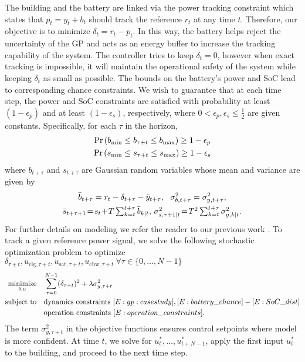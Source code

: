 The building and the battery are linked via the power tracking constraint which states that \(p_t = y_t + b_t\) should track the reference \(r_t\) at any time \(t\). Therefore, our objective is to minimize \(\delta_t = r_t - p_t\).
In this way, the battery helps reject the uncertainty of the GP and acts as an energy buffer to increase the tracking capability of the system. 
The controller tries to keep \(\delta_t = 0\), however when exact tracking is impossible, it will maintain the operational safety of the system while keeping \(\delta_t\)  as small as possible.
The bounds on the battery's power and SoC lead to corresponding chance constraints.
We wish to guarantee that at each time step, the power and SoC constraints are satisfied with probability at least \((1 - \epsilon_p)\) and  at least \((1 - \epsilon_s)\), respectively, where \(0 < \epsilon_p, \epsilon_s \leq \frac{1}{2}\) are given constants.
Specifically, for each \(\tau\) in the horizon,
	\begin{gather}
	\label{E:battery_chance}
	\Pr\left( \Pbmin \leq b_{\tau+t}\leq \Pbmax \right) \geq 1 - \epsilon_p  \\
	\label{E:SoC_chance}
	\Pr\left( \SOCmin \leq s_{\tau+t} \leq \SOCmax \right) \geq 1 - \epsilon_s 
	\end{gather}
where \(b_{t+\tau}\) and \(s_{t+\tau}\) are Gaussian random variables whose mean and variance are given by
\begin{gather}
\bar{b}_{t+\tau}= r_{t} - \delta_{t+\tau} - \bar{y}_{t+\tau}, \ \ 
\sigma^2_{b,t+\tau} =  \sigma^2_{y,t+\tau} \text, \label{E:battery_dist} \\
\bar{s}_{t+\tau+1}\!=\! s_t \!+\! T \textstyle\sum_{k=t}^{t+\tau} \predict{k}{\bar{\Pbatt}}, \,
\predict{s,\tau+1}{\sigma^2} \!=\! T^2 \textstyle\sum_{k=t}^{t+\tau} \predict{y,k}{\sigma^2} \text. \label{E:SoC_dist}
\end{gather}
For further details on modeling we refer the reader to our previous work \cite{nghiemetal16gp}.
To track a given reference power signal, we solve the following stochastic optimization problem to optimize \(\delta_{\tau+t},u_{\mathrm{clg},\tau+t},u_{\mathrm{sat},\tau+t},u_{\mathrm{chw},\tau+t} \ \forall \tau \in \{0,\dots,N-1\}\)
\begin{align}
\label{E:casestudy:mpc}
\minimize_{\delta, u} \quad & \sum_{\tau=0}^{N-1} (\delta_{\tau+t})^2 + \lambda \sigma_{y,\tau+t}^2\\
\st \quad & \text{dynamics constraints } \eqref{E:gp:casestudy}, \eqref{E:battery_chance} - \eqref{E:SoC_dist} \nonumber \\
&  \text{operation constraints } \eqref{E:operation_constraints}. \nonumber
\end{align}
The term \( \sigma_{y,\tau+t}^2\) in the objective functions ensures control setpoints where model is more confident.
At time \(t\), we solve for \(u^*_{t},\dots,u^*_{t+N-1} \), apply the first input \(u^*_{t} \) to the building, and proceed to the next time step.

